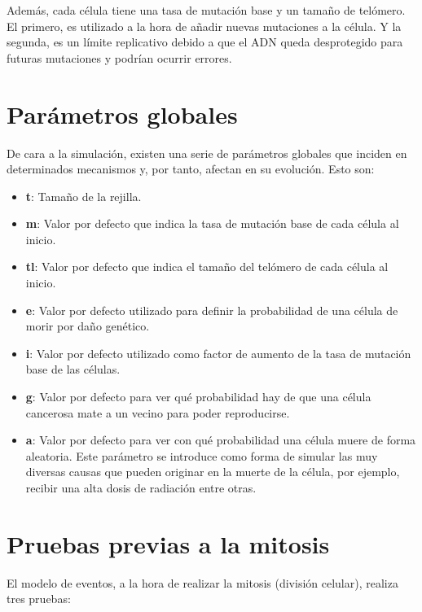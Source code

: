 Además, cada célula tiene una tasa de mutación base y un tamaño de telómero. El primero, es utilizado a la hora
de añadir nuevas mutaciones a la célula. Y la segunda, es un límite replicativo debido a que el ADN queda
desprotegido para futuras mutaciones y podrían ocurrir errores.

\section{Parámetros globales}

De cara a la simulación, existen una serie de parámetros globales que inciden en determinados mecanismos y,
por tanto, afectan en su evolución. Esto son:

\begin{itemize}
    \item \textbf{t}: Tamaño de la rejilla.
    \item \textbf{m}: Valor por defecto que indica la tasa de mutación base de cada célula al inicio.
    \item \textbf{tl}: Valor por defecto que indica el tamaño del telómero de cada célula al inicio.
    \item \textbf{e}: Valor por defecto utilizado para definir la probabilidad de una célula de morir por daño genético.
    \item \textbf{i}: Valor por defecto utilizado como factor de aumento de la tasa de mutación base de las células.
    \item \textbf{g}: Valor por defecto para ver qué probabilidad hay de que una célula cancerosa mate a un vecino para
    poder reproducirse.
    \item \textbf{a}: Valor por defecto para ver con qué probabilidad una célula muere de forma aleatoria. Este parámetro
    se introduce como forma de simular las muy diversas causas que pueden originar en la muerte de la célula, por ejemplo,
    recibir una alta dosis de radiación entre otras.
\end{itemize}

\section{Pruebas previas a la mitosis}

El modelo de eventos, a la hora de realizar la mitosis (división celular), realiza tres pruebas:

